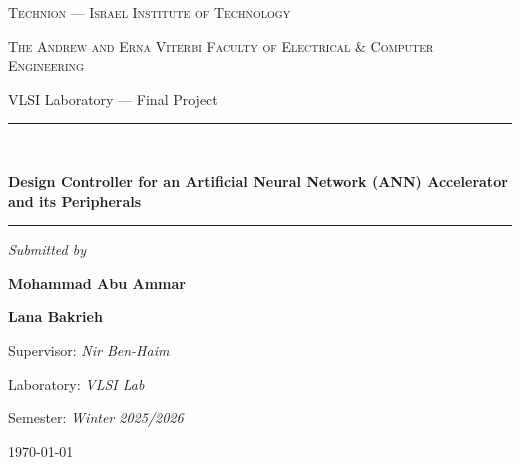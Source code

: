
\begin{titlepage}
\centering
\vspace*{1.2cm}

{\scshape\Large Technion --- Israel Institute of Technology \par}
\vspace{0.4cm}
{\scshape\large The Andrew and Erna Viterbi Faculty of Electrical \& Computer Engineering \par}
\vspace{0.3cm}
{\large VLSI Laboratory --- Final Project \par}

\vspace{2.0cm}

\rule{\linewidth}{0.5pt}\\[0.4cm]
{\huge\bfseries Design Controller for an Artificial Neural Network (ANN)
Accelerator and its Peripherals \par}
\vspace{0.4cm}
\rule{\linewidth}{0.5pt}

\vspace{1.5cm}

{\large\itshape Submitted by\par}
\vspace{0.5cm}
{\Large\bfseries Mohammad Abu Ammar \par}
\vspace{0.2cm}
{\Large\bfseries Lana Bakrieh \par}

\vfill

{\large Supervisor: \textit{Nir Ben-Haim}\par}
\vspace{0.3cm}
{\large Laboratory: \textit{VLSI Lab}\par}
\vspace{0.3cm}
{\large Semester: \textit{Winter 2025/2026}\par}

\vspace{1.0cm}

{\large \today\par}
\end{titlepage}

\clearpage
